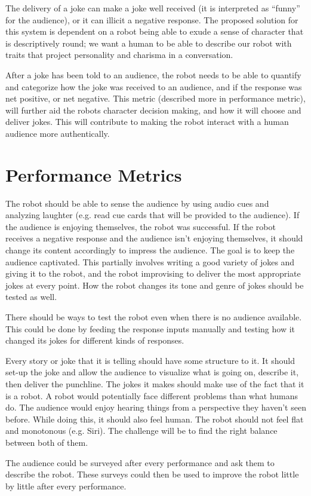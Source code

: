 \documentclass[onecolumn, draftclsnofoot,10pt, compsoc]{IEEEtran}
\begin{document}
The delivery of a joke can make a joke well received (it is interpreted as “funny” for the audience), or it can illicit a negative response. The proposed solution for this system is dependent on a robot being able to exude a sense of character that is descriptively round; we want a human to be able to describe our robot with traits that project personality and charisma in a conversation.

After a joke has been told to an audience, the robot needs to be able to quantify and categorize how the joke was received to an audience, and if the response was net positive, or net negative. This metric (described more in performance metric), will further aid the robots character decision making, and how it will choose and deliver jokes. This will contribute to making the robot interact with a human audience more authentically.
 

\section{Performance Metrics}



The robot should be able to sense the audience by using audio cues and analyzing laughter (e.g. read cue cards that will be provided to the audience). If the audience is enjoying themselves, the robot was successful. If the robot receives a negative response and the audience isn’t enjoying themselves, it should change its content accordingly to impress the audience. The goal is to keep the audience captivated. This partially involves writing a good variety of jokes and giving it to the robot, and the robot improvising to deliver the most appropriate jokes at every point. How the robot changes its tone and genre of jokes should be tested as well. 

There should be ways to test the robot even when there is no audience available. This could be done by feeding the response inputs manually and testing how it changed its jokes for different kinds of responses. 

Every story or joke that it is telling should have some structure to it. It should set-up the joke and allow the audience to visualize what is going on, describe it, then deliver the punchline. The jokes it makes should make use of the fact that it is a robot. A robot would potentially face different problems than what humans do. The audience would enjoy hearing things from a perspective they haven’t seen before. While doing this, it should also feel human. The robot should not feel flat and monotonous (e.g. Siri). The challenge will be to find the right balance between both of them.

The audience could be surveyed after every performance and ask them to describe the robot. These surveys could then be used to improve the robot little by little after every performance. 
\end{document}

